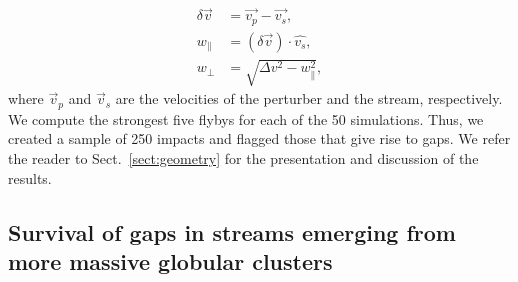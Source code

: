         \begin{equation}
            \begin{aligned}
            \delta \vec{v} &=\vec{v_p} - \vec{v_s}, \\
            w_\parallel &= \left(\delta \vec{v}\right)\cdot \hat{v_s},\\  
            w_\perp &=  \sqrt{\Delta v ^2 - w_\parallel ^ 2},
            \end{aligned}
        \end{equation}
        where $\vec{v}_p$ and $\vec{v}_s$ are the velocities of the perturber and the stream, respectively. We compute the strongest five flybys for each of the 50 simulations. Thus, we created a sample of 250 impacts and flagged those that give rise to gaps. We refer the reader to Sect.~\ref{sect:geometry} for the presentation and discussion of the results.

    \subsection{Survival of gaps in streams emerging from more massive globular clusters}\label{sec:gaps_vs_gcmass}

